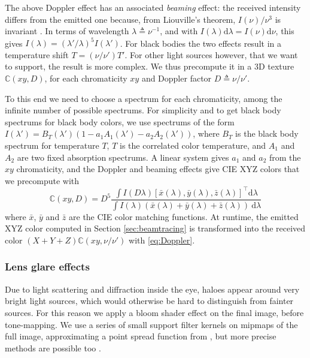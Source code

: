 \documentclass{document}
\newcommand{\diff}{\mathrm d}
\begin{document}
The above Doppler effect has an associated {\em beaming} effect: the received 
intensity differs from the emitted one because, from Liouville's theorem, 
$I(\nu) / \nu^3$ is invariant \cite{Misner1973}. In terms of wavelength  
$\lambda \triangleq \nu^{-1}$, and with $I(\lambda) \diff \lambda = I(\nu) 
\diff \nu$, this gives $I(\lambda) = (\lambda' / \lambda)^5 I(\lambda')$. For 
black bodies the two effects result in a temperature shift $T = (\nu / \nu') 
T'$. For other light sources however, that we want to support, the result is 
more complex. We thus precompute it in a 3D texture $\mathbb{C}(xy, D)$, for 
each chromaticity $xy$ and Doppler factor $D \triangleq \nu / \nu'$.

To this end we need to choose a spectrum for each chromaticity, among the 
infinite number of possible spectrums. For simplicity and to get black body 
spectrums for black body colors, we use spectrums of the form $I(\lambda') = 
B_T(\lambda')(1 - a_1 A_1(\lambda') -a_2 A_2(\lambda'))$, where $B_T$ is the 
black body spectrum for temperature $T$, $T$ is the correlated color 
temperature, and $A_1$ and $A_2$ are two fixed absorption spectrums. A linear 
system gives $a_1$ and $a_2$ from the $xy$ chromaticity, and the Doppler and 
beaming effects give CIE XYZ colors that we precompute with
\begin{equation}
\mathbb{C}(xy,D) = D^5
    \frac{\int I(D\lambda) \left[ \bar{x}(\lambda), \bar{y}(\lambda),  
    	        \bar{z}(\lambda)\right]^{\top} \diff \lambda}
         {\int I(\lambda) (\bar{x}(\lambda) + \bar{y}(\lambda) +   
         	    \bar{z}(\lambda))\ \diff\lambda}
\end{equation}
where $\bar{x}$, $\bar{y}$ and $\bar{z}$ are the CIE color matching functions. 
At runtime, the emitted XYZ color computed in Section \ref{sec:beamtracing} is 
transformed into the received color $(X + Y + Z)\mathbb{C}(xy, \nu/\nu')$ 
with \eqref{eq:Doppler}.

\subsubsection{Lens glare effects}

Due to light scattering and diffraction inside the eye, haloes appear around 
very bright light sources, which would otherwise be hard to distinguish from 
fainter sources. For this reason we apply a bloom shader effect on the final 
image, before tone-mapping. We use a series of small support filter kernels on 
mipmaps of the full image, approximating a point spread function from 
\cite{Spencer95}, but more precise methods are possible too 
\cite{HullinSIG2011}.
\end{document}
